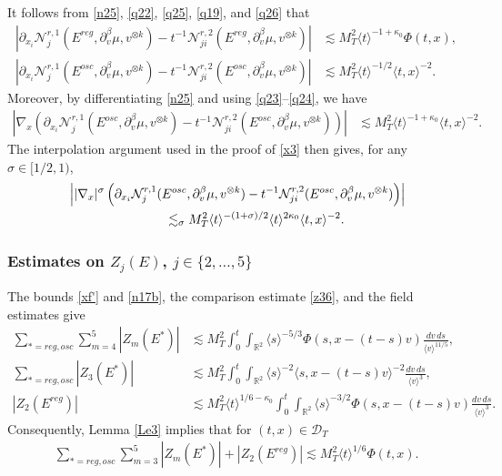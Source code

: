 \documentclass[reqno,11pt]{amsart}
\numberwithin{equation}{section}
\def\R{{\mathbb R}}
\def\R{{\bf R}}
\def\R{\mathbb{R}}
\begin{document}
It follows from \eqref{n25}, \eqref{q22}, \eqref{q25}, \eqref{q19}, and
\eqref{q26} that
\begin{align}
\left|\partial_{x_i}\mathcal N_j^{r,1}(E^{reg},\partial_v^\beta\mu,v^{\otimes k})-t^{-1}\mathcal N_{ji}^{r,2}(E^{reg},\partial_v^\beta\mu,v^{\otimes k})\right|
&\lesssim M_T^2\langle t\rangle^{-1+\kappa_0}\Phi(t,x),
\label{q33}\\
\left|\partial_{x_i}\mathcal N_j^{r,1}(E^{osc},\partial_v^\beta\mu,v^{\otimes k})
-t^{-1}\mathcal N_{ji}^{r,2}(E^{osc},\partial_v^\beta\mu,v^{\otimes k})\right|
&\lesssim M_T^2\langle t\rangle^{-1/2}\langle t,x\rangle^{-2}.
\label{q34}
\end{align}
Moreover, by differentiating \eqref{n25} and using \eqref{q23}--\eqref{q24}, we have
\begin{align}
\left|\nabla_x\left(
\partial_{x_i}\mathcal N_j^{r,1}(E^{osc},\partial_v^\beta\mu,v^{\otimes k})
-t^{-1}\mathcal N_{ji}^{r,2}(E^{osc},\partial_v^\beta\mu,v^{\otimes k})\right)\right|
&\lesssim M_T^2\langle t\rangle^{-1+\kappa_0}
\langle t,x\rangle^{-2}.
\label{q35}
\end{align}
The interpolation argument used in the proof of \eqref{x3} then gives,
for any $\sigma\in[1/2,1)$,
\begin{equation}\label{q34-35}
\begin{split}
&\left||\nabla_x|^\sigma\left(
\partial_{x_i}\mathcal N_j^{r,1}(E^{osc},\partial_v^\beta\mu,v^{\otimes k})-t^{-1}\mathcal N_{ji}^{r,2}(E^{osc},\partial_v^\beta\mu,v^{\otimes k})
\right)\right|\\
&\hspace{27mm}\lesssim_\sigma
M_T^2\langle t\rangle^{-(1+\sigma)/2}\langle t\rangle^{2\kappa_0}\langle t,x\rangle^{-2}.
\end{split}
\end{equation}

\subsubsection{Estimates on $Z_j(E)$, $j\in\{2,\ldots,5\}$} The bounds \eqref{xf'} and \eqref{n17b}, the comparison estimate \eqref{z36}, and the field estimates give
\begin{align*}
\sum_{*=reg,osc}\sum_{m=4}^5|Z_m(E^*)|
&\lesssim M_T^2\!\!\int_0^t\int_{\R^2}
\langle s\rangle^{-5/3}\Phi(s,x-(t-s)v)
\frac{dv\,ds}{\langle v\rangle^{11/5}},\\
\sum_{*=reg,osc}|Z_3(E^*)|
&\lesssim M_T^2\int_0^t\!\!\int_{\R^2}
\langle s\rangle^{-2}\langle s,x-(t-s)v\rangle^{-2}
\frac{dv\,ds}{\langle v\rangle^3},\\
|Z_2(E^{reg})|
&\lesssim M_T^2\langle t\rangle^{1/6-\kappa_0}
\int_0^t\!\!\int_{\R^2}
\langle s\rangle^{-3/2}\Phi(s,x-(t-s)v)
\frac{dv\,ds}{\langle v\rangle^3}.
\end{align*}
Consequently, Lemma \ref{Le3} implies that for $(t,x)\in\mathcal{D}_T$
\begin{align}
\sum_{*=reg,osc}\sum_{m=3}^5|Z_m(E^*)|+|Z_2(E^{reg})|\lesssim M_T^2\langle t\rangle^{1/6}\Phi(t,x).
\label{q31}
\end{align}
\end{document}
